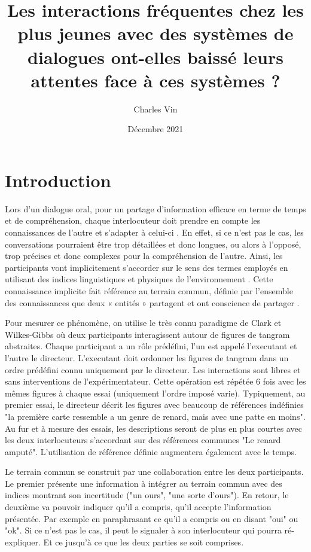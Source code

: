 \documentclass{article}
\title{Les interactions fréquentes chez les plus jeunes avec des systèmes de dialogues ont-elles baissé leurs attentes face à ces systèmes ?}
\author{Charles Vin}
\date{Décembre 2021}
\begin{document}
\maketitle \newpage

\section{Introduction}
Lors d'un dialogue oral, pour un partage d'information efficace en terme de temps et de compréhension, chaque interlocuteur doit prendre en compte les connaissances de l'autre et s'adapter à celui-ci \cite{clark_1996}\cite{TunerKnutsen}. En effet, si ce n'est pas le cas, les conversations pourraient être trop détaillées et donc longues, ou alors à l'opposé, trop précises et donc complexes pour la compréhension de l'autre. Ainsi, les participants vont implicitement s'accorder sur le sens des termes employés en utilisant des indices linguistiques et physiques de l'environnement \cite{Clark1981-CLADKA}. Cette connaissance implicite fait référence au terrain commun, définie par l'ensemble des connaissances que deux « entités » partagent et ont conscience de partager \cite{clark_1996}\cite{Clark1981-CLADKA}\cite{stalnaker1978a}.

Pour mesurer ce phénomène, on utilise le très connu paradigme de Clark et Wilkes-Gibbs \cite{clark1986a} où deux participants interagissent autour de figures de tangram abstraites. Chaque participant a un rôle prédéfini, l'un est appelé l'executant et l'autre le directeur. L'executant doit ordonner les figures de tangram dans un ordre prédéfini connu uniquement par le directeur. Les interactions sont libres et sans interventions de l'expérimentateur. Cette opération est répétée 6 fois avec les mêmes figures à chaque essai (uniquement l'ordre imposé varie). Typiquement, au premier essai, le directeur décrit les figures avec beaucoup de références indéfinies "la première carte ressemble a un genre de renard, mais avec une patte en moins". Au fur et à mesure des essais, les descriptions seront de plus en plus courtes avec les deux interlocuteurs s'accordant sur des références communes "Le renard amputé". L'utilisation de référence définie augmentera également avec le temps. 

Le terrain commun se construit par une collaboration entre les deux participants. Le premier présente une information à intégrer au terrain commun avec des indices montrant son incertitude ("un ours", "une sorte d'ours"). En retour, le deuxième va pouvoir indiquer qu'il a compris, qu'il accepte l'information présentée. Par exemple en paraphrasant ce qu'il a compris ou en disant "oui" ou "ok". Si ce n'est pas le cas, il peut le signaler à son interlocuteur qui pourra ré-expliquer. Et ce jusqu'à ce que les deux parties se soit comprises.
\end{document}
